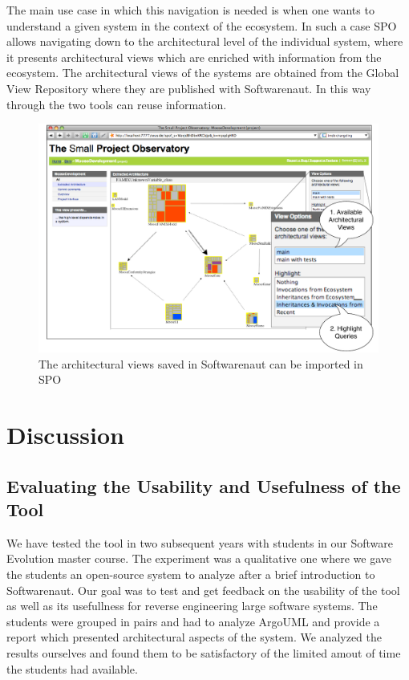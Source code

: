 \documentclass[preprint,12pt]{elsarticle}
\begin{document}
The main use case in which this navigation is needed is when one wants to understand a given system in the context of the ecosystem. In such a case SPO allows navigating down to the architectural level of the individual system, where it presents architectural views which are enriched with information from the ecosystem. The architectural views of the systems are obtained from the Global View Repository where they are published with Softwarenaut. In this way through the two tools can reuse information.

\begin{figure}[th!]
\begin{center}
\includegraphics[width=0.7\linewidth]{images/SpoArchitectural}
\caption{The architectural views saved in Softwarenaut can be imported in SPO}
\label{}
\end{center}
\end{figure}



\newpage
\section {Discussion}
\label {sec:disc}

\subsection {Evaluating the Usability and Usefulness of the Tool}
We have tested the tool in two subsequent years with students in our Software Evolution master course. The experiment was a qualitative one where we gave the students an open-source system to analyze after a brief introduction to Softwarenaut. Our goal was to test and get feedback on the usability of the tool as well as its usefullness for reverse engineering large software systems. The students were grouped in pairs and had to analyze ArgoUML and provide a report which presented architectural aspects of the system. We analyzed the results ourselves and found them to be satisfactory of the limited amout of time the students had available. 
\end{document}
